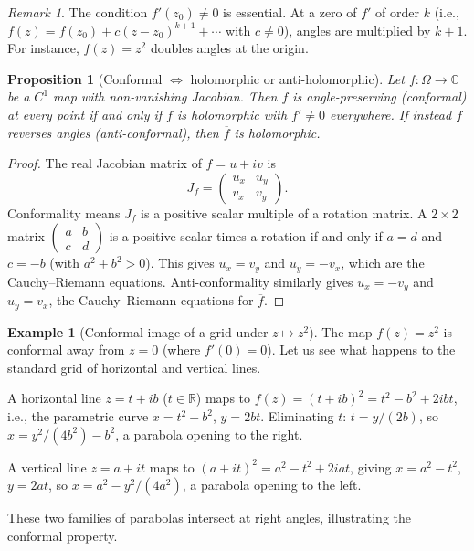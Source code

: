 \documentclass[12pt,a4paper,openany]{book}
\theoremstyle{definition}
\newtheorem{example}[definition]{Example}
\theoremstyle{plain}
\newtheorem{proposition}[definition]{Proposition}
\theoremstyle{remark}
\newtheorem{remark}[definition]{Remark}
\newcommand{\C}{\mathbb{C}}
\newcommand{\R}{\mathbb{R}}
\newcommand{\conj}[1]{\overline{#1}}
\begin{document}
\begin{remark}
The condition $f'(z_0)\neq 0$ is essential. At a zero of $f'$ of order $k$ (i.e., $f(z)=f(z_0)+c(z-z_0)^{k+1}+\cdots$ with $c\neq 0$), angles are multiplied by $k+1$. For instance, $f(z)=z^2$ doubles angles at the origin.
\end{remark}

\begin{proposition}[Conformal $\Leftrightarrow$ holomorphic or anti-holomorphic]
\label{prop:conformal-iff}
Let $f:\Omega\to\C$ be a $C^1$ map with non-vanishing Jacobian. Then $f$ is angle-preserving (conformal) at every point if and only if $f$ is holomorphic with $f'\neq 0$ everywhere. If instead $f$ reverses angles (anti-conformal), then $\conj{f}$ is holomorphic.
\end{proposition}

\begin{proof}
The real Jacobian matrix of $f = u+iv$ is
\[
  J_f = \begin{pmatrix} u_x & u_y \\ v_x & v_y \end{pmatrix}.
\]
Conformality means $J_f$ is a positive scalar multiple of a rotation matrix. A $2\times 2$ matrix $\begin{pmatrix}a & b \\ c & d\end{pmatrix}$ is a positive scalar times a rotation if and only if $a=d$ and $c=-b$ (with $a^2+b^2>0$). This gives $u_x=v_y$ and $u_y=-v_x$, which are the Cauchy--Riemann equations. Anti-conformality similarly gives $u_x=-v_y$ and $u_y=v_x$, the Cauchy--Riemann equations for $\conj{f}$.
\end{proof}

\begin{example}[Conformal image of a grid under $z\mapsto z^2$]
\label{ex:conformal-z2}
The map $f(z)=z^2$ is conformal away from $z=0$ (where $f'(0)=0$). Let us see what happens to the standard grid of horizontal and vertical lines.

A horizontal line $z=t+ib$ ($t\in\R$) maps to $f(z)=(t+ib)^2 = t^2-b^2+2ibt$, i.e., the parametric curve $x=t^2-b^2$, $y=2bt$. Eliminating $t$: $t=y/(2b)$, so $x = y^2/(4b^2)-b^2$, a parabola opening to the right.

A vertical line $z=a+it$ maps to $(a+it)^2 = a^2-t^2+2iat$, giving $x=a^2-t^2$, $y=2at$, so $x=a^2-y^2/(4a^2)$, a parabola opening to the left.

These two families of parabolas intersect at right angles, illustrating the conformal property.
\end{example}
\end{document}
